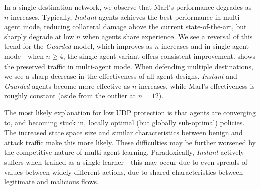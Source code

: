 \documentclass[10pt, times, conference, letterpaper]{IEEEtran}
\begin{document}
%	
%
%	
%
%	

In a single-destination network, we observe that Marl's performance degrades as $n$ increases.
Typically, \emph{Instant} agents achieves the best performance in multi-agent mode, reducing collateral damage above the current state-of-the-art, but sharply degrade at low $n$ when agents share experience.
We see a reversal of this trend for the \emph{Guarded} model, which improves as $n$ increases and in single-agent mode---when $n\ge4$, the single-agent variant offers consistent improvement.
 shows the preserved traffic in multi-agent mode.
When defending multiple destinations, we see a sharp decrease in the effectiveness of all agent designs.
\emph{Instant} and \emph{Guarded} agents become more effective as $n$ increases, while Marl's effectiveness is roughly constant (aside from the outlier at $n=12$).

The most likely explanation for low UDP protection is that agents are converging to, and becoming stuck in, locally optimal (but globally sub-optimal) policies.
The increased state space size and similar characteristics between benign and attack traffic make this more likely.
These difficulties may be further worsened by the competitive nature of multi-agent learning.
Paradoxically, \emph{Instant} actively suffers when trained as a single learner---this may occur due to even spreads of values between widely different actions, due to shared characteristics between legitimate and malicious flows.
\end{document}

